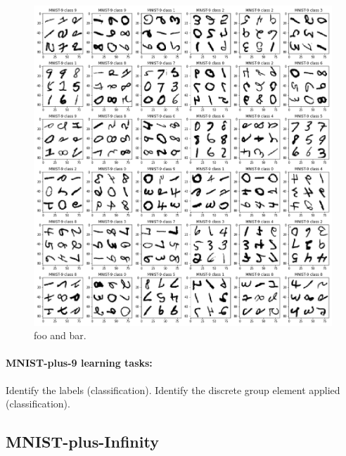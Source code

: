 \documentclass{article}
\begin{document}
\begin{figure}[t!]
\includegraphics[width=\textwidth]{../notebooks/MNIST-9.png}
\caption{foo and bar.\label{fig:9}}
\end{figure}

\paragraph{MNIST-plus-9 learning tasks:} Identify the labels (classification). Identify the discrete group element applied (classification).

\subsection{MNIST-plus-Infinity}
\end{document}

